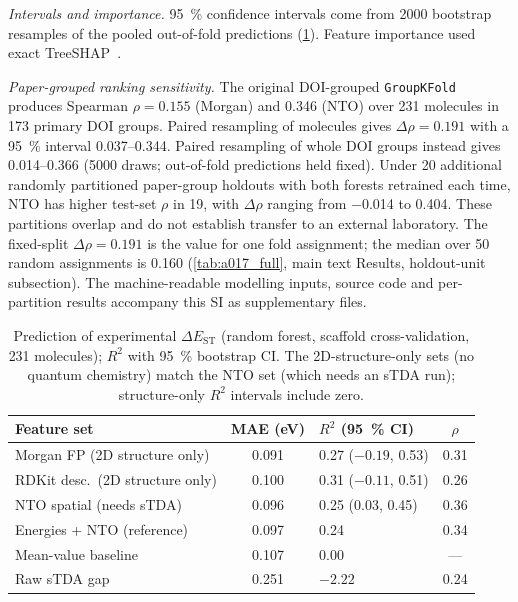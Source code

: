 \documentclass[final,3p,times,twocolumn]{elsarticle}
\begin{document}
\emph{Intervals and importance.} \qty{95}{\percent} confidence intervals come from
\num{2000} bootstrap resamples of the pooled out-of-fold predictions
(\cref{tab:model_metrics}). Feature importance used exact TreeSHAP~\cite{Lundberg2017}.

\emph{Paper-grouped ranking sensitivity.} The original DOI-grouped
\texttt{GroupKFold} produces Spearman $\rho = \num{0.155}$ (Morgan) and
\num{0.346} (NTO) over \num{231} molecules in \num{173} primary DOI groups.
Paired resampling of molecules gives $\Delta\rho = \num{0.191}$ with a
\qty{95}{\percent} interval \numrange{0.037}{0.344}. Paired resampling of
whole DOI groups instead gives \numrange{0.014}{0.366} (\num{5000} draws;
out-of-fold predictions held fixed). Under \num{20} additional randomly
partitioned paper-group holdouts with both forests retrained each time,
NTO has higher test-set $\rho$ in \num{19}, with $\Delta\rho$ ranging from
\num{-0.014} to \num{0.404}. These partitions overlap and do not establish
transfer to an external laboratory. The fixed-split $\Delta\rho = \num{0.191}$ is the value for one fold
assignment; the median over \num{50} random assignments is \num{0.160}
(\cref{tab:a017_full}, main text Results, holdout-unit subsection). The machine-readable modelling inputs,
source code and per-partition results accompany this SI as supplementary files.

\begin{table}[t]
  \centering
  \caption{Prediction of experimental $\Delta E_\text{ST}$ (random forest,
    scaffold cross-validation, \num{231} molecules); $R^2$ with \qty{95}{\percent}
    bootstrap CI. The 2D-structure-only sets (no quantum chemistry) match the NTO
    set (which needs an sTDA run); structure-only $R^2$ intervals include zero.}
  \label{tab:model_metrics}
  \small
  \begin{tabular}{@{}l@{}clc@{}}
    \toprule
    Feature set & MAE (eV) & $R^2$ (\qty{95}{\percent} CI) & $\rho$ \\
    \midrule
    Morgan FP (2D structure only)   & 0.091 & 0.27 ($-0.19$, 0.53) & 0.31 \\
    RDKit desc.\ (2D structure only) & 0.100 & 0.31 ($-0.11$, 0.51) & 0.26 \\
    NTO spatial (needs sTDA)        & 0.096 & 0.25 (0.03, 0.45) & 0.36 \\
    Energies + NTO (reference)      & 0.097 & 0.24 & 0.34 \\
    Mean-value baseline             & 0.107 & 0.00 & --- \\
    Raw sTDA gap                    & 0.251 & $-2.22$ & 0.24 \\
    \bottomrule
  \end{tabular}
\end{table}
\end{document}
